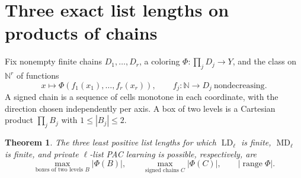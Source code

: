\documentclass[11pt]{article}
\newtheorem{theorem}{Theorem}
\newcommand{\N}{\mathbb N}
\newcommand{\LD}{\operatorname{LD}}
\newcommand{\MD}{\operatorname{MD}}
\begin{document}
\section{Three exact list lengths on products of chains}
Fix nonempty finite chains $D_1,\ldots,D_r$, a coloring $\Phi:\prod_jD_j\to Y$, and the class on $\N^r$ of functions
\[
   x\longmapsto \Phi(f_1(x_1),\ldots,f_r(x_r)),
   \qquad f_j:\N\to D_j\ \text{nondecreasing}.
\]
A signed chain is a sequence of cells monotone in each coordinate, with the direction chosen independently per axis. A box of two levels is a Cartesian product $\prod_j B_j$ with $1\le|B_j|\le2$.
\begin{theorem}\label{widths}
The three least positive list lengths for which $\LD_\ell$ is finite, $\MD_\ell$ is finite, and private $\ell$-list PAC learning is possible, respectively, are
\[
 \max_{\text{boxes of two levels }B}|\Phi(B)|,\qquad
 \max_{\text{signed chains }C}|\Phi(C)|,\qquad
 |\operatorname{range}\Phi|.
\]
\end{theorem}
\end{document}
